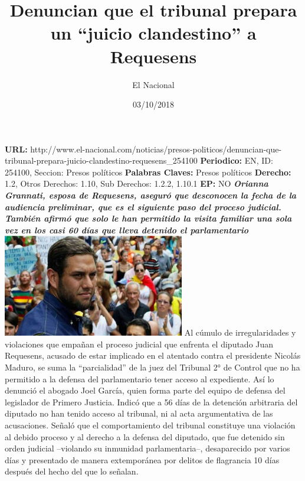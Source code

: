 \documentclass{article}%
\title{\textbf{Denuncian que el tribunal prepara un “juicio clandestino” a Requesens}}%
\author{El Nacional}%
\date{03/10/2018}%
\begin{document}
%
\normalsize%
\maketitle%
\textbf{URL: }%
http://www.el{-}nacional.com/noticias/presos{-}politicos/denuncian{-}que{-}tribunal{-}prepara{-}juicio{-}clandestino{-}requesens\_254100\newline%
%
\textbf{Periodico: }%
EN, %
ID: %
254100, %
Seccion: %
Presos políticos\newline%
%
\textbf{Palabras Claves: }%
Presos políticos\newline%
%
\textbf{Derecho: }%
1.2, %
Otros Derechos: %
1.10, %
Sub Derechos: %
1.2.2, 1.10.1\newline%
%
\textbf{EP: }%
NO\newline%
\newline%
%
\textbf{\textit{Orianna Grannati, esposa de Requesens, aseguró que desconocen la fecha de la audiencia preliminar, que es el siguiente paso del proceso judicial. También afirmó que solo le han permitido la visita familiar una sola vez en los casi 60 días que lleva detenido el parlamentario~}}%
\newline%
\newline%
%
\includegraphics[width=300px]{112.jpg}%
\newline%
%
Al cúmulo de irregularidades y violaciones que empañan el proceso judicial que enfrenta el diputado Juan Requesens, acusado de estar implicado en el atentado contra el presidente Nicolás Maduro, se suma la “parcialidad” de la juez del Tribunal 2° de Control que no ha permitido a la defensa del parlamentario tener acceso al expediente.%
\newline%
%
Así lo denunció el abogado Joel García, quien forma parte del equipo de defensa del legislador de Primero Justicia. Indicó que a 56 días de la detención arbitraria del diputado no han tenido acceso al tribunal, ni al acta argumentativa de las acusaciones.%
\newline%
%
Señaló que el comportamiento del tribunal constituye una violación al debido proceso y al derecho a la defensa del diputado, que fue detenido sin orden judicial –violando su inmunidad parlamentaria–, desaparecido por varios días y presentado de manera extemporánea por delitos de flagrancia 10 días después del hecho del que lo señalan.%
\end{document}
